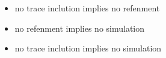 \begin{itemize}
\item no trace inclution implies no refenment
\item no refenment implies no simulation
\item no trace inclution implies no simulation
\end{itemize}

